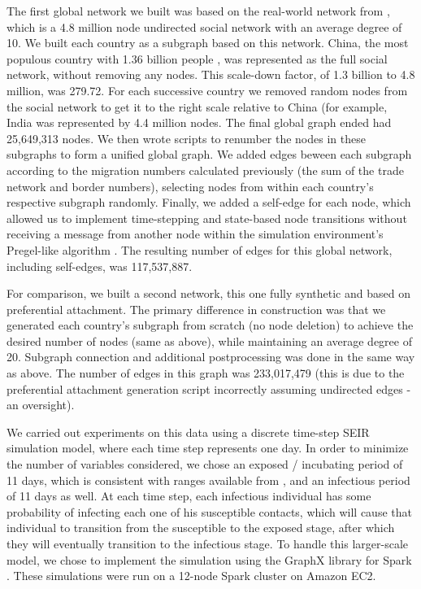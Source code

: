 \documentclass[10pt, journal,onecolumn]{IEEEtran}
\begin{document}
The first global network we built was based on the real-world network from \citep{topcoderdata},
which is a 4.8 million node undirected social network with an average degree of 10. We built each country
as a subgraph based on this network. China, the most populous country with 1.36 billion people
\citep{ciapopulation}, was represented as the full social network, without removing any nodes.
This scale-down factor, of 1.3 billion to 4.8 million, was 279.72.
For each successive country we removed random
nodes from the social network to get it to the right scale relative to China (for example, India
was represented by 4.4 million nodes. The final global graph ended had 25,649,313 nodes.
We then wrote scripts to renumber the nodes in these subgraphs to form a unified global graph.
We added edges beween each subgraph according to the migration numbers calculated previously
(the sum of the trade network and border numbers),
selecting nodes from within each country's respective subgraph randomly.
Finally, we added a self-edge for each node, which allowed us to implement time-stepping and
state-based node transitions without receiving a message from another node within the simulation
environment's Pregel-like algorithm \citep{malewicz2010pregel}.
The resulting number of edges for this global network, including self-edges, was 117,537,887.

For comparison, we built a second network, this one fully synthetic and based on preferential attachment.
The primary difference in construction was that we generated each country's subgraph from scratch
(no node deletion) to achieve the desired number of nodes (same as above), while maintaining an average
degree of 20. Subgraph connection and additional postprocessing was done in the same way as above.
The number of edges in this graph was 233,017,479 (this is due to the preferential attachment generation
script incorrectly assuming undirected edges - an oversight).

We carried out experiments on this data using a discrete time-step SEIR simulation model,
where each time step represents one day. In order to minimize the number of variables considered,
we chose an exposed / incubating period of 11 days, which is consistent with ranges available
from \citep{whoebolafacts}, and an infectious period of 11 days as well. At each time step, each
infectious individual has some probability of infecting each one of his susceptible contacts, which
will cause that individual to transition from the susceptible to the exposed stage, after which
they will eventually transition to the infectious stage. To handle this larger-scale model, we chose
to implement the simulation using the GraphX library \citep{xin2013graphx} for Spark
\citep{zaharia2010spark}. These simulations were run on a 12-node Spark cluster on Amazon EC2.
\end{document}
